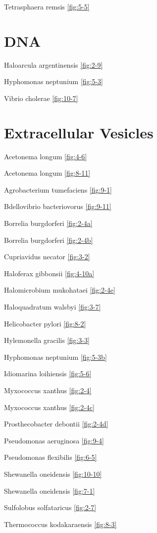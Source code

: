 \documentclass[]{tufte-book}
\begin{document}
Tetrasphaera remsis \ref{fig:5-5}

\section{\texorpdfstring{\textbf{DNA}}{DNA}}\label{dna}

Haloarcula argentinensis \ref{fig:2-9}

Hyphomonas neptunium \ref{fig:5-3}

Vibrio cholerae \ref{fig:10-7}

\section{\texorpdfstring{\textbf{Extracellular
Vesicles}}{Extracellular Vesicles}}\label{extracellular-vesicles}

Acetonema longum \ref{fig:4-6}

Acetonema longum \ref{fig:8-11}

Agrobacterium tumefaciens \ref{fig:9-1}

Bdellovibrio bacteriovorus \ref{fig:9-11}

Borrelia burgdorferi \ref{fig:2-4a}

Borrelia burgdorferi \ref{fig:2-4b}

Cupriavidus necator \ref{fig:3-2}

Haloferax gibbonsii \ref{fig:4-10a}

Halomicrobium mukohataei \ref{fig:2-4e}

Haloquadratum walsbyi \ref{fig:3-7}

Helicobacter pylori \ref{fig:8-2}

Hylemonella gracilis \ref{fig:3-3}

Hyphomonas neptunium \ref{fig:5-3b}

Idiomarina loihiensis \ref{fig:5-6}

Myxococcus xanthus \ref{fig:2-4}

Myxococcus xanthus \ref{fig:2-4c}

Prosthecobacter debontii \ref{fig:2-4d}

Pseudomonas aeruginosa \ref{fig:9-4}

Pseudomonas flexibilis \ref{fig:6-5}

Shewanella oneidensis \ref{fig:10-10}

Shewanella oneidensis \ref{fig:7-1}

Sulfolobus solfataricus \ref{fig:2-7}

Thermococcus kodakaraensis \ref{fig:8-3}
\end{document}
